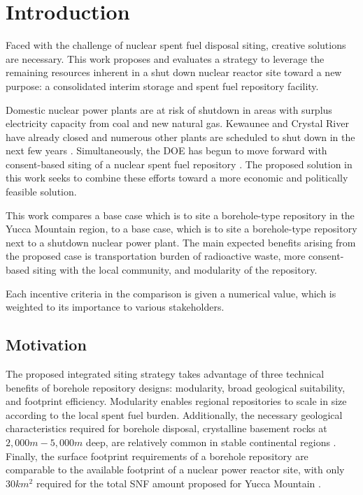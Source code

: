 
\section{Introduction}
Faced with the challenge of nuclear spent fuel disposal siting, creative solutions 
are necessary. This work proposes and evaluates a strategy to leverage the 
remaining resources inherent in a shut down nuclear reactor site toward a new 
purpose: a consolidated interim storage and spent fuel repository facility.

Domestic nuclear power plants are at risk of shutdown in areas with surplus 
electricity capacity from coal and new natural gas. Kewaunee and Crystal River 
have already closed  and numerous other plants are scheduled to shut down in 
the next few years \cite{nei_shutdowns_2016}.  Simultaneously, the \gls{DOE} 
has begun to move forward with consent-based siting of a nuclear 
spent fuel repository \cite{doe_consent_2016}. The proposed solution in this 
work seeks to combine these efforts toward a more economic and politically 
feasible solution. 

This work compares a base case which is to site a borehole-type repository in the
 Yucca Mountain region, to a base case, which is to site a borehole-type repository
 next to a shutdown nuclear power plant. The main expected benefits arising from the
 proposed case is transportation burden of radioactive waste, more consent-based
 siting with the local community, and modularity of the repository. 

Each incentive criteria in the comparison is given a numerical value, which is
weighted to its importance to various stakeholders. 

\subsection{Motivation}
The proposed integrated siting strategy takes advantage of three technical 
benefits of borehole repository designs: modularity, broad geological 
suitability, and footprint efficiency. Modularity enables regional repositories 
to scale in size according to the local spent fuel burden. 
Additionally, the necessary geological characteristics required for borehole 
disposal, crystalline basement rocks at $2,000 m - 5,000 m$ deep, are relatively 
common in stable continental regions \cite{arnold_research_2012}. Finally, the 
surface footprint requirements of a borehole repository are comparable to the 
available footprint of a nuclear power reactor site, with only $30 km^2$ 
required for the total \gls{SNF} amount proposed for Yucca Mountain 
\cite{brady_deep_2009}.

